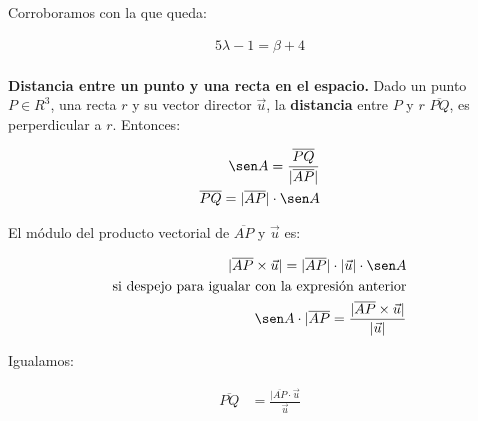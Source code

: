 \documentclass{article}
\begin{document}
Corroboramos con la que queda:

\begin{align*}
    5 \lambda - 1 = \beta + 4 \\
\end{align*}

\textbf{Distancia entre un punto y una recta en el espacio.}
Dado un punto \(P \in R^3\), una recta \(r\)
y su vector director \(\vec{u}\),
la \textbf{distancia} entre \(P\) y \(r\) \(\overline{PQ}\),
es perperdicular a \(r\). Entonces:

\begin{align*}
    \sen A = \frac{\overline{PQ}}{|\overline{AP}|} \\
    \overline{PQ} = |\overline{AP}| \cdot \sen A   \\
\end{align*}

El módulo del producto vectorial de \(\overline{AP}\) y \(\vec{u}\) es:

\begin{align*}
    |\overline{AP} \times \vec{u}| = |\overline{AP}| \cdot |\vec{u}| \cdot \sen A  \\
    \text{si despejo para igualar con la expresión anterior}                      \\
    \sen A \cdot |\overline{AP} = \frac{|\overline{AP} \times \vec{u}|}{|\vec{u}|} \\
\end{align*}

Igualamos:

\begin{align*}
    \overline{PQ} & = \frac{|\overline{AP} \cdot \vec{u}}{\vec{u}}
\end{align*}
\end{document}
